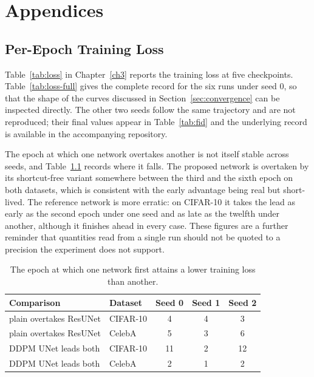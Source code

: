 \chapter{Appendices}
\label{appendix}

\section{Per-Epoch Training Loss}
\label{sec:loss-full}

Table~\ref{tab:loss} in Chapter~\ref{ch3} reports the training loss at five checkpoints.
Table~\ref{tab:loss-full} gives the complete record for the six runs under seed 0, so that the shape
of the curves discussed in Section~\ref{sec:convergence} can be inspected directly. The other two
seeds follow the same trajectory and are not reproduced; their final values appear in
Table~\ref{tab:fid} and the underlying record is available in the accompanying repository.

The epoch at which one network overtakes another is not itself stable across seeds, and
Table~\ref{tab:crossover} records where it falls. The proposed network is overtaken by its
shortcut-free variant somewhere between the third and the sixth epoch on both datasets, which is
consistent with the early advantage being real but short-lived. The reference network is more
erratic: on CIFAR-10 it takes the lead as early as the second epoch under one seed and as late as
the twelfth under another, although it finishes ahead in every case. These figures are a further
reminder that quantities read from a single run should not be quoted to a precision the experiment
does not support.

\begin{table}[htbp]
    \centering
    \caption{The epoch at which one network first attains a lower training loss than another.}
    \label{tab:crossover}
    \small
    \begin{tabular}{llccc}
        \toprule
        Comparison & Dataset & Seed 0 & Seed 1 & Seed 2 \\
        \midrule
        plain overtakes ResUNet & CIFAR-10 & 4 & 4 & 3 \\
        plain overtakes ResUNet & CelebA   & 5 & 3 & 6 \\
        \midrule
        DDPM UNet leads both    & CIFAR-10 & 11 & 2 & 12 \\
        DDPM UNet leads both    & CelebA   & 2 & 1 & 2 \\
        \bottomrule
    \end{tabular}
\end{table}

